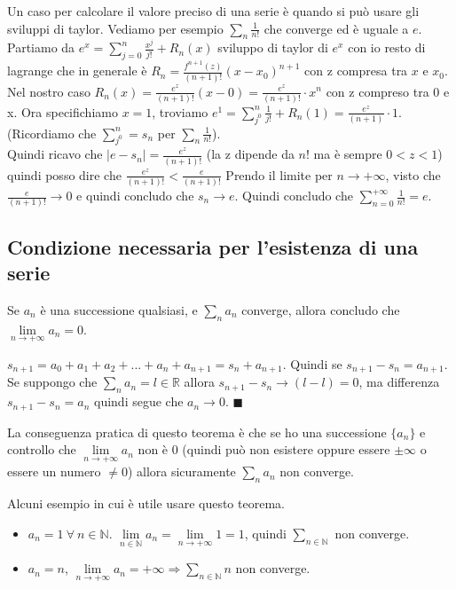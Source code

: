 \begin{example}
Un caso per calcolare il valore preciso di una serie è quando si può usare gli sviluppi di taylor. Vediamo per esempio $\sum_{n}\frac{1}{n!}$ che converge ed è uguale a $e$.\\
Partiamo da $e^x = \sum_{j=0}^n \frac{x^j}{j!} + R_n(x)$ sviluppo di taylor di $e^x$ con io resto di lagrange che in generale è $R_n = \frac{f^{n+1}(z)}{(n+1)!}(x - x_0)^{n+1}$ con z compresa tra $x$ e $x_0$.\\
Nel nostro caso $R_n(x) = \frac{e^z}{(n+1)!}(x-0) = \frac{e^z}{(n+1)!}\cdot x^n$ con z compreso tra 0 e x. Ora specifichiamo $x=1$, troviamo $e^1 = \sum_{j^0}^n \frac{1}{j!} + R_n(1) = \frac{e^z}{(n+1)}\cdot 1$. (Ricordiamo che $\sum_{j^0}^n = s_n$ per $\sum_n \frac{1}{n!}$).\\
Quindi ricavo che $|e - s_n| = \frac{e^z}{(n+1)!}$ (la z dipende da $n!$ ma è sempre $0 < z < 1$) quindi posso dire che $\frac{e^z}{(n+1)!} < \frac{e}{(n+1)!}$ Prendo il limite per $n\to +\infty$, visto che $\frac{e}{(n+1)!} \to 0$ e quindi concludo che $s_n \to e$. Quindi concludo che $\sum_{n=0}^{+\infty} \frac{1}{n!} = e$.
\end{example}

\subsection{Condizione necessaria per l'esistenza di una serie}
\begin{theorem}
Se $a_n$ è una successione qualsiasi, e $\sum_n a_n$ converge, allora concludo che $\lim\limits_{n\to +\infty}a_n = 0$.
\end{theorem}

\begin{demostration}
$s_{n+1} = a_0 + a_1 + a_2 + ... + a_n + a_{n+1} = s_n + a_{n+1}$. Quindi se $s_{n+1} - s_n = a_{n+1}$. Se suppongo che $\sum_n a_n = l \in \mathbb{R}$ allora $s_{n+1} - s_n \to (l - l) = 0$, ma differenza $s_{n+1} - s_n = a_n$ quindi segue che $a_n \to 0$. $\blacksquare$
\end{demostration}

\hspace{-15pt}La conseguenza pratica di questo teorema è che se ho una successione $\{a_n\}$ e controllo che $\lim\limits_{n\to +\infty}a_n$ non è 0 (quindi può non esistere oppure essere $\pm \infty$ o essere un numero $\neq 0$) allora sicuramente $\sum_n a_n$ non converge.

\begin{example}
Alcuni esempio in cui è utile usare questo teorema.
\begin{itemize}
    \item $a_n = 1 \: \forall \: n \in \mathbb{N}$. $\lim\limits_{n \in \mathbb{N}}a_n = \lim\limits_{n\to +\infty} 1 = 1$, quindi $\sum_{n\in \mathbb{N}}$ non converge.
    \item $a_n = n$, $\lim\limits_{n\to +\infty} a_n = +\infty \Longrightarrow \sum_{n\in \mathbb{N}}n$ non converge.
\end{itemize}
\end{example}

